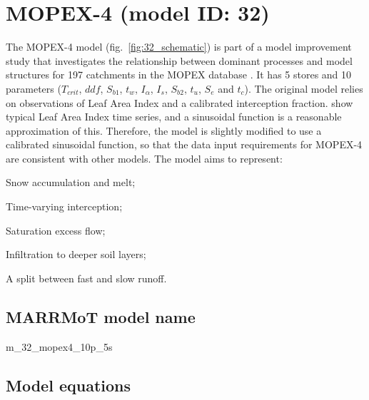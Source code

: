 \section{MOPEX-4 (model ID: 32)}
The MOPEX-4 model (fig.~\ref{fig:32_schematic}) is part of a model improvement study that investigates the relationship between dominant processes and model structures for 197 catchments in the MOPEX database \citep{Ye2012}. It has 5 stores and 10 parameters ($T_{crit}$, $ddf$, $S_{b1}$, $t_w$, $I_{\alpha}$, $I_{s}$, $S_{b2}$, $t_u$, $S_e$ and $t_c$). The original model relies on observations of Leaf Area Index and a calibrated interception fraction. \citet{Liang1994} show typical Leaf Area Index time series, and a sinusoidal function is a reasonable approximation of this. Therefore, the model is slightly modified to use a calibrated sinusoidal function, so that the data input requirements for MOPEX-4 are consistent with other models.  The model aims to represent:

\begin{itemizecompact}
\item Snow accumulation and melt;
\item Time-varying interception;
\item Saturation excess flow;
\item Infiltration to deeper soil layers;
\item A split between fast and slow runoff.
\end{itemizecompact}

\subsection{MARRMoT model name}
m\_32\_mopex4\_10p\_5s \\

\subsection{Model equations}

